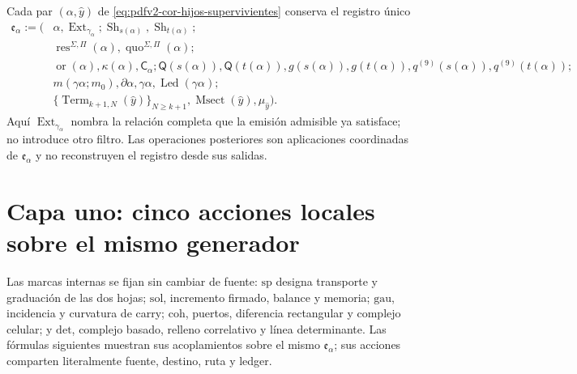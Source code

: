 Cada par \((\alpha,\widehat y)\) de
\eqref{eq:pdfv2-cor-hijos-supervivientes} conserva el registro único
\begin{equation}
\label{eq:pdfv2-cor-registro-extension}
 \begin{aligned}
 \mathfrak e_\alpha:=\bigl(&
 \alpha,\operatorname{Ext}_{\gamma_\alpha};
 \operatorname{Sh}_{s(\alpha)},\operatorname{Sh}_{t(\alpha)};\\
 &
 \operatorname{res}^{\Sigma,\Pi}(\alpha),
 \operatorname{quo}^{\Sigma,\Pi}(\alpha);\\
 &\operatorname{or}(\alpha),\kappa(\alpha),\mathsf C_\alpha;
 \mathsf Q(s(\alpha)),\mathsf Q(t(\alpha)),g(s(\alpha)),g(t(\alpha)),
 q^{(9)}(s(\alpha)),q^{(9)}(t(\alpha));\\
 &
 m(\gamma\alpha;m_0),\partial\alpha,\gamma\alpha,
 \operatorname{Led}(\gamma\alpha);\\
 &\{\operatorname{Term}_{k+1,N}(\widehat y)\}_{N\geq k+1},
 \operatorname{Msect}(\widehat y),\mu_{\widehat y}\bigr).
 \end{aligned}
\end{equation}
Aquí \(\operatorname{Ext}_{\gamma_\alpha}\) nombra la relación completa que
la emisión admisible ya satisface; no introduce otro filtro. Las operaciones
posteriores son aplicaciones coordinadas de \(\mathfrak e_\alpha\) y no
reconstruyen el registro desde sus salidas.

\section{Capa uno: cinco acciones locales sobre el mismo generador}

Las marcas internas se fijan sin cambiar de fuente:
\(\mathrm{sp}\) designa transporte y graduación de las dos hojas;
\(\mathrm{sol}\), incremento firmado, balance y memoria;
\(\mathrm{gau}\), incidencia y curvatura de carry;
\(\mathrm{coh}\), puertos, diferencia rectangular y complejo celular; y
\(\mathrm{det}\), complejo basado, relleno correlativo y línea determinante. Las fórmulas
siguientes muestran sus acoplamientos sobre el mismo
\(\mathfrak e_\alpha\); sus acciones comparten literalmente fuente, destino,
ruta y ledger.

